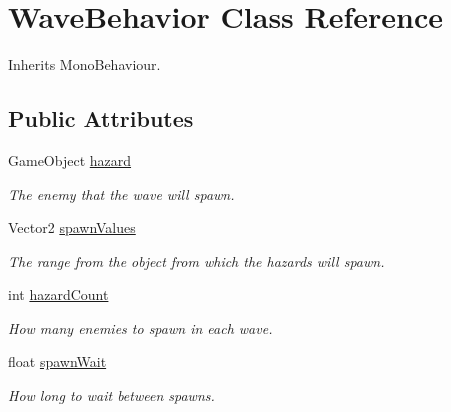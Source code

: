 \hypertarget{class_wave_behavior}{}\section{Wave\+Behavior Class Reference}
\label{class_wave_behavior}


Inherits Mono\+Behaviour.

\subsection*{Public Attributes}
\begin{DoxyCompactItemize}
\item 
\mbox{\label{class_wave_behavior_a6890b5a829fbd0d27517b75ab3e9fa12}} 
Game\+Object \mbox{\hyperlink{class_wave_behavior_a6890b5a829fbd0d27517b75ab3e9fa12}{hazard}}
\begin{DoxyCompactList}\small\item\em The enemy that the wave will spawn. \end{DoxyCompactList}\item 
\mbox{\label{class_wave_behavior_ae26807be7d4406478efc4886aa610189}} 
Vector2 \mbox{\hyperlink{class_wave_behavior_ae26807be7d4406478efc4886aa610189}{spawn\+Values}}
\begin{DoxyCompactList}\small\item\em The range from the object from which the hazards will spawn. \end{DoxyCompactList}\item 
\mbox{\label{class_wave_behavior_a3790e0815c8d88a71e77e3227b050b42}} 
int \mbox{\hyperlink{class_wave_behavior_a3790e0815c8d88a71e77e3227b050b42}{hazard\+Count}}
\begin{DoxyCompactList}\small\item\em How many enemies to spawn in each wave. \end{DoxyCompactList}\item 
\mbox{\label{class_wave_behavior_a401c9221c61cc6b50bc1d538b5365555}} 
float \mbox{\hyperlink{class_wave_behavior_a401c9221c61cc6b50bc1d538b5365555}{spawn\+Wait}}
\begin{DoxyCompactList}\small\item\em How long to wait between spawns. \end{DoxyCompactList}\item 

\end{DoxyCompactItemize}
